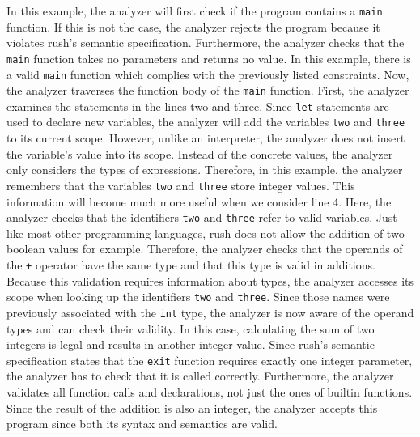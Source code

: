 In this example, the analyzer will first check if the program contains a \texttt{main} function.
If this is not the case, the analyzer rejects the program because it violates rush's semantic specification.
Furthermore, the analyzer checks that the \texttt{main} function takes no parameters and returns no value. In this
example, there is a valid \texttt{main} function which complies with the previously listed constraints. Now, the analyzer traverses the
function body of the \texttt{main} function. First, the analyzer examines the statements in the lines two and three.
Since \texttt{let} statements are used to declare
new variables, the analyzer will add the variables \texttt{two} and \texttt{three} to its
current scope. However, unlike an interpreter, the analyzer does not insert the
variable's value into its scope. Instead of the concrete values, the analyzer
only considers the types of expressions. Therefore, in this example, the
analyzer remembers that the variables \texttt{two} and \texttt{three} store integer values.
This information will become much more useful when we consider line 4. Here, the
analyzer checks that the identifiers \texttt{two} and \texttt{three} refer to valid variables.
Just like most other programming languages, rush does not allow the addition
of two boolean values for example. Therefore, the analyzer checks that the operands
of the \texttt{+} operator have the same type and that this type is valid in additions. %
Because this validation requires information about types, the analyzer accesses
its scope when looking up the identifiers \texttt{two} and \texttt{three}. Since those names
were previously associated with the \texttt{int} type, the analyzer is now aware of the
operand types and can check their validity. In this case, calculating the
sum of two integers is legal and results in another integer value. Since rush's
semantic specification states that the \texttt{exit} function requires exactly one
integer parameter, the analyzer has to check that it is called correctly.
Furthermore, the analyzer validates all function calls and declarations, not
just the ones of builtin functions. Since the result of the addition is also an
integer, the analyzer accepts this program since both its syntax and semantics
are valid.

